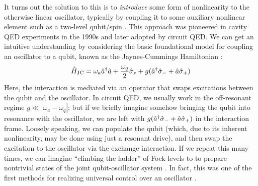 It turns out the solution to this is to \textit{introduce} some form of nonlinearity to the otherwise linear oscillator, typically by coupling it to some auxiliary nonlinear element such as a two-level qubit/spin \cite{cai2021bosonic, raimond2006exploring, haroche2020cavity, blais2021circuit}. This approach was pioneered in cavity QED experiments in the 1990s and later adopted by circuit QED. We can get an intuitive understanding by considering the basic foundational model for coupling an oscillator to a qubit, known as the Jaynes-Cummings Hamiltonian \cite{raimond2006exploring}:
\begin{equation}
    \hat{H}_{\rm JC} = \omega_a \hat{a}^\dagger\hat{a} + \frac{\omega_q}{2}\hat{\sigma}_z + g(\hat{a}^\dagger\hat{\sigma}_- + \hat{a}\hat{\sigma}_+)
\end{equation}
Here, the interaction is mediated via an operator that swaps excitations between the qubit and the oscillator. In circuit QED, we usually work in the off-resonant regime $g \ll |\omega_a - \omega_q|$; but if we briefly imagine somehow bringing the qubit into resonance with the oscillator, we are left with $g(\hat{a}^\dagger\hat{\sigma}_- + \hat{a}\hat{\sigma}_+)$ in the interaction frame. Loosely speaking, we can populate the qubit (which, due to its inherent nonlinearity, may be done using just a resonant drive), and then swap the excitation to the oscillator via the exchange interaction. If we repeat this many times, we can imagine ``climbing the ladder'' of Fock levels to to prepare nontrivial states of the joint qubit-oscillator system \cite{krause1989preparation, meystre1990cat, vogel1993quantum}. In fact, this was one of the first methods for realizing universal control over an oscillator \cite{law1996arbitrary}. 

